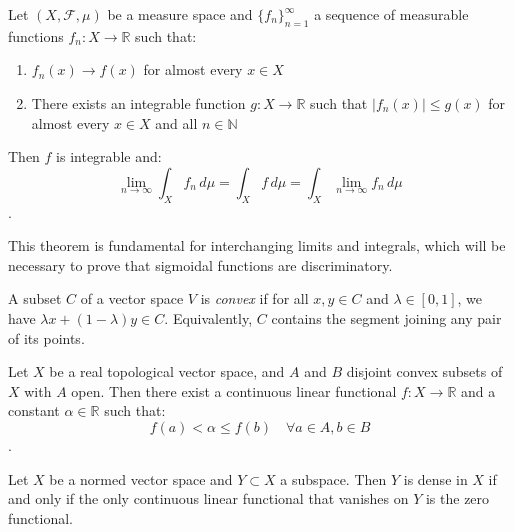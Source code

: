 \begin{theorem}\label{thm:convergencia_dominada}
	Let \((X, \mathcal{F}, \mu)\) be a measure space and \(\{f_n\}_{n=1}^\infty\) a sequence of measurable functions \(f_n: X \to \mathbb{R}\) such that:
	\begin{enumerate}
		\item \(f_n(x) \to f(x)\) for almost every \(x \in X\)
		\item There exists an integrable function \(g: X \to \mathbb{R}\) such that \(|f_n(x)| \leq g(x)\) for almost every \(x \in X\) and all \(n \in \mathbb{N}\)
	\end{enumerate}
	Then \(f\) is integrable and:
	\[
		\lim_{n \to \infty} \int_X f_n \, d\mu = \int_X f \, d\mu = \int_X \lim_{n \to \infty} f_n \, d\mu
	\]
	\citep[Theorem~2.24]{Folland1999}.
\end{theorem}

This theorem is fundamental for interchanging limits and integrals, which will be necessary to prove that sigmoidal functions are discriminatory.

\begin{definition}\label{def:conjunto_convexo}
	A subset $C$ of a vector space $V$ is \textit{convex} if for all $x, y \in C$ and $\lambda \in [0,1]$, we have $\lambda x + (1-\lambda)y \in C$. Equivalently, $C$ contains the segment joining any pair of its points.
\end{definition}

\begin{theorem}\label{thm:hahn_banach}
	Let \(X\) be a real topological vector space, and \(A\) and \(B\) disjoint convex subsets of \(X\) with \(A\) open. Then there exist a continuous linear functional \(f: X \to \mathbb{R}\) and a constant \(\alpha \in \mathbb{R}\) such that:
	\[
		f(a) < \alpha \leq f(b) \quad \forall a \in A, b \in B
	\]
	\citep[Theorem~5.5]{Folland1999}.
\end{theorem}

\begin{corollary}\label{cor:caracterizacion_densidad}
	Let \(X\) be a normed vector space and \(Y \subset X\) a subspace. Then \(Y\) is dense in \(X\) if and only if the only continuous linear functional that vanishes on \(Y\) is the zero functional.
\end{corollary}

